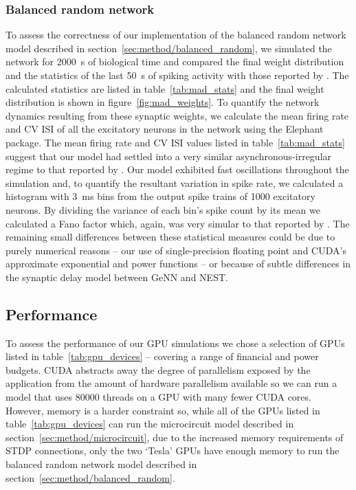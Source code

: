 \documentclass[utf8]{frontiersSCNS} %
\begin{document}
\subsubsection{Balanced random network}
To assess the correctness of our implementation of the balanced random network model described in section~\ref{sec:method/balanced_random}, we simulated the network for \SI{2000}{\second} of biological time and compared the final weight distribution and the statistics of the last \SI{50}{\second} of spiking activity with those reported by \citet{Morrison2007}.
The calculated statistics are listed in table~\ref{tab:mad_stats} and the final weight distribution is shown in figure~\ref{fig:mad_weights}.
To quantify the network dynamics resulting from these synaptic weights, we calculate the mean firing rate and CV ISI of all the excitatory neurons in the network using the Elephant~\citep{Yegenoglu2018} package.
The mean firing rate and CV ISI values listed in table~\ref{tab:mad_stats} suggest that our model had settled into a very similar asynchronous-irregular regime to that reported by \citeauthor{Morrison2007}.
Our model exhibited fast oscillations throughout the simulation and, to quantify the resultant variation in spike rate, we calculated a histogram with \SI{3}{\milli\second} bins from the output spike trains of \num{1000} excitatory neurons.
By dividing the variance of each bin's spike count by its mean we calculated a Fano factor which, again, was very simular to that reported by \citeauthor{Morrison2007}.
The remaining small differences between these statistical measures could be due to purely numerical reasons -- our use of single-precision floating point and CUDA's approximate exponential and power functions -- or because of subtle differences in the synaptic delay model between GeNN and NEST.

\subsection{Performance}
\label{sec:results/performance}
To assess the performance of our GPU simulations we chose a selection of GPUs listed in table~\ref{tab:gpu_devices} -- covering a range of financial and power budgets.
CUDA abstracts away the degree of parallelism exposed by the application from the amount of hardware parallelism available so we can run a model that uses \num{80000} threads on a GPU with many fewer CUDA cores.
However, memory is a harder constraint so, while all of the GPUs listed in table~\ref{tab:gpu_devices} can run the microcircuit model described in section~\ref{sec:method/microcircuit}, due to the increased memory requirements of STDP connections, only the two `Tesla' GPUs have enough memory to run the balanced random network model described in section~\ref{sec:method/balanced_random}.
\end{document}
